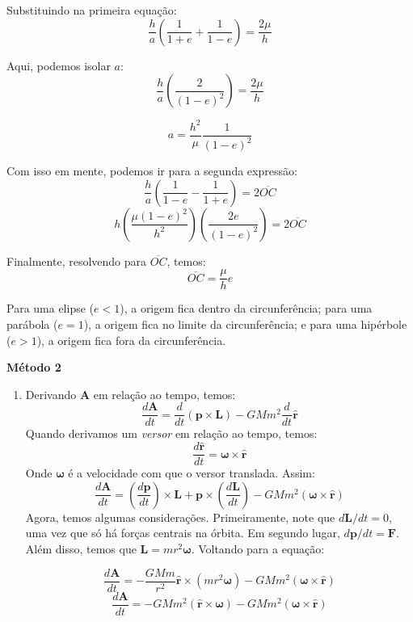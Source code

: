 \documentclass[11pt]{article}
\begin{document}
\begin{pproblem}
\begin{pssolution*}{}{}
\begin{enumerate}[label=\textbf{\Roman*.}]
            Substituindo na primeira equação:
            \[\frac{h}{a}\left(\frac{1}{1+e}+\frac{1}{1-e}\right) = \frac{2\mu}{h}\]
            
            Aqui, podemos isolar \(a\):
            \[\frac{h}{a}\left(\frac{2}{(1-e)^2}\right) = \frac{2\mu}{h}\]

            \[a = \frac{h^2}{\mu}\frac{1}{(1-e)^2}\]

            Com isso em mente, podemos ir para a segunda expressão:
            \[\frac{h}{a}\left(\frac{1}{1-e}-\frac{1}{1+e}\right) = 2\overline{OC}\]
            \[h\left(\frac{\mu(1-e)^2}{h^2}\right)\left(\frac{2e}{(1-e)^2}\right) = 2\overline{OC}\]
            
            Finalmente, resolvendo para \(\overline{OC}\), temos:
            \[\boxed{\overline{OC} = \frac{\mu}{h}e}\]

            Para uma elipse (\(e<1\)), a origem fica dentro da circunferência; para uma parábola (\(e=1\)), a origem fica no limite da circunferência; e para uma hipérbole (\(e>1\)), a origem fica fora da circunferência.
        \end{enumerate}

    
        \textbf{Método 2}
        \begin{enumerate}[label=\textbf{\Roman*.}]
            \item Derivando \(\mathbf{A}\) em relação ao tempo, temos:
            \[\frac{d\mathbf{A}}{dt} = \frac{d}{dt}(\mathbf{p}\times\mathbf{L}) - GMm^2\frac{d}{dt}\mathbf{\hat{r}}\] 
            Quando derivamos um \textit{versor} em relação ao tempo, temos:
            \[\frac{d\mathbf{\hat{r}}}{dt} = \mathbf{\omega}\times\mathbf{\hat{r}}\]
            Onde \(\mathbf{\omega}\) é a velocidade com que o versor translada. Assim:
            \[\frac{d\mathbf{A}}{dt} = \left(\frac{d\mathbf{p}}{dt}\right)\times \mathbf{L} + \mathbf{p}\times\left(\frac{d\mathbf{L}}{dt}\right) - GMm^2(\mathbf{\omega}\times \mathbf{\hat{r}})\]
            Agora, temos algumas considerações. Primeiramente, note que \(d\mathbf{L}/dt=0\), uma vez que só há forças centrais na órbita. Em segundo lugar, \(d\mathbf{p}/dt = \mathbf{F}\). Além disso, temos que \(\mathbf{L} = mr^2\mathbf{\omega}\). Voltando para a equação:

            \[\frac{d\mathbf{A}}{dt} = -\frac{GMm}{r^2}\mathbf{\hat{r}}\times(mr^2\mathbf{\omega}) - GMm^2(\mathbf{\omega} \times \mathbf{\hat{r}})\]
            \[\frac{d\mathbf{A}}{dt} = -GMm^2(\mathbf{\hat{r}}\times\mathbf{\omega})- GMm^2(\mathbf{\omega} \times \mathbf{\hat{r}})\]


\end{enumerate}
\end{pssolution*}
\end{pproblem}
\end{document}
